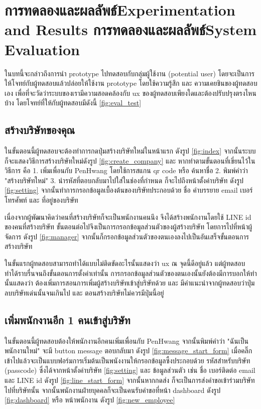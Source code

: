 \chapter{\ifproject%
\ifcpe การทดลองและผลลัพธ์\else Experimentation and Results\fi
\else%
\ifcpe การทดลองและผลลัพธ์\else System Evaluation\fi
\fi}
\quad ในบทนี้จะกล่าวถึงการนำ prototype ไปทดสอบกับกลุ่มผู้ใช้งาน (potential user) โดยจะเป็นการให้โจทย์กับผู้ทดสอบแล้วปล่อยให้ใช้งาน prototype โดยใช้ความรู้สึก และ ความเคยชินของผู้ทดสอบเอง 
เพื่อที่จะวัดว่าระบบของเรามีความสอดคล้องกับ ux ของผู้ทดสอบเพียงใดและต้องปรับปรุงตรงไหนบ้าง โดยโจทย์ที่ให้กับผู้ทดสอบมีดังนี้ \ref{fig:eval_test}

\section{สร้างบริษัทของคุณ} 
ในขั้นตอนนี้ผู้ทดสอบจะต้องทำการกดปุ่มสร้างบริษัทใหม่ในหน้าแรก ดังรูป \ref{fig:index} จากนั้นระบบก็จะแสดงวิธีการสร้างบริษัทใหม่ดังรูป \ref{fig:create_company}
และ หากทำตามขั้นตอนที่เขี่ยนไว้ในวิธีการ คือ 1. เพิ่มเพื่อนกับ PenHwang โดยใช้การสแกน qr code หรือ ค้นหาชื่อ 2. พิมพ์คำว่า "สร้างบริษัทใหม่" 3. นำรหัสที่ตอบกลับมาไปใส่ในช่องที่กำหนด
ก็จะไปถึงหน้าตั้งค่าบริษัท ดังรูป \ref{fig:setting} จากนั้นทำการกรอกข้อมูลเบื้องต้นของบริษัทประกอบด้วย ชื่อ คำบรรยาย email เบอร์โทรศัพท์ และ ที่อยู่ของบริษัท

เนื่องจากผู้พัฒนาคิดว่าคนที่สร้างบริษัทก็จะเป็นพนักงานคนนึง จึงได้สร้างพนักงานโดยใช้ LINE id ของคนที่สร้างบริษัท ขั้นตอนต่อไปจึงเป็นการกรอกข้อมูลส่วนตัวของผู้สร้างบริษัท 
โดยการไปที่หน้าผู้จัดการ ดังรูป \ref{fig:manager} จากนั้นก็กรอกข้อมูลส่วนตัวของตนเองลงไปเป็นอันเสร็จขั้นตอนการสร้างบริษัท

ในขั้นแรกผู้ทดสอบสามารถทำได้แบบไม่ติดขัดอะไรนั้นแสดงว่า ux ณ จุดนี้ดีอยู่แล้ว แต่ผู้ทดสอบทำได้ราบรื่นจนถึงขั้นตอนการตั้งค่าเท่านั้น การกรอกข้อมูลส่วนตัวของตนเองนั้นยังต้องมีการบอกให้ทำ
นั้นแสดงว่า ต้องเพิ่มการสอนการเพิ่มผู้สร้างบริษัทเข้าสู่บริษัทด้วย และ มีคำแนะนำจากผู้ทดสอบว่าปุ่มลบบริษัทเด่นนั้นจนเกินไป และ ตอนสร้างบริษัทไม่ควรมีปุ่มนี้อยู่

\section{เพิ่มพนักงานอีก 1 คนเข้าสู่บริษัท}
ในขั้นตอนนี้ผู้ทดสอบต้องให้พนักงานอีกคนเพิ่มเพื่อนกับ PenHwang จากนั้นพิมพ์คำว่า "ฉันเป็นพนักงานใหม่" จะมี button message ตอบกลับมา ดังรูป \ref{fig:message_start_form}
เมื่อคลิ๊กเข้าไปแล้วจะเป็นแบบฟอร์มการเริ่มต้นเป็นพนังงานให้กรอกข้อมูลซี้งประกอบด้วย รหัสสำหรับบริษัท (passcode) ซึ่งได้จากหน้าตั้งค่าบริษัท \ref{fig:setting} และ ข้อมูลส่วนตัว เช่น ชื่อ เบอร์ติดต่อ email และ LINE id ดังรูป \ref{fig:line_start_form} 
จากนั้นหากกดส่ง 
ก็จะเป็นการส่งคำขอเข้าร่วมบริษัทไปที่บริษัทนั้น จากนั้นพนักงานฝ่ายบุคคลก็จะเป็นคนรับคำขอที่หน้า dashboard ดังรูป \ref{fig:dashboard} หรือ หน้าพนักงาน ดังรูป \ref{fig:new_employee}

